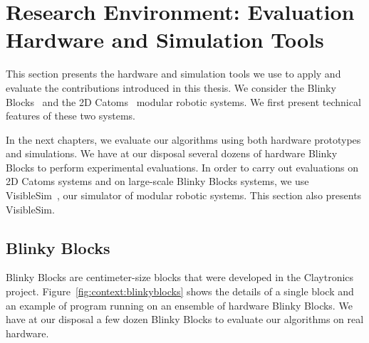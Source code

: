 \section[Research Environment: Evaluation Hardware and Simulation Tools]{Research Environment: Evaluation Hardware and Simulation Tools%
	}
\label{section:context:environment}

This section presents the hardware and simulation tools we use to apply and evaluate the contributions introduced in this thesis. We consider the Blinky Blocks~\cite{Kirby-chi11} and the 2D Catoms~\cite{karagozler-iros09,karagozler-phdthesis} modular robotic systems. We first present technical features of these two systems.

In the next chapters, we evaluate our algorithms using both hardware prototypes and simulations. We have at our disposal several dozens of hardware Blinky Blocks to perform experimental evaluations. In order to carry out evaluations on 2D Catoms systems and on large-scale Blinky Blocks systems, we use VisibleSim~\cite{dhoutaut2013efficient}, our simulator of modular robotic systems. This section also presents VisibleSim.

\subsection{Blinky Blocks}
\label{section:context:blinkyblocks}

Blinky Blocks are centimeter-size blocks that were developed in the Claytronics project. Figure~\ref{fig:context:blinkyblocks} shows the details of a single block and an example of program running on an ensemble of hardware Blinky Blocks. We have at our disposal a few dozen Blinky Blocks to evaluate our algorithms on real hardware.

